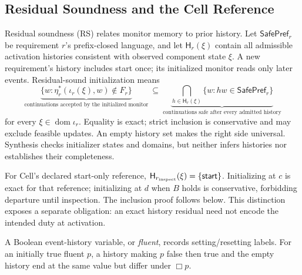\subsection{Residual Soundness and the Cell Reference}\label{ta:residual_formal}
Residual soundness (RS) relates monitor memory to prior history. Let $\mathsf{SafePref}_r$ be requirement $r$'s prefix-closed language, and let $\mathsf H_r(\xi)$ contain all admissible activation histories consistent with observed component state $\xi$. A new requirement's history includes start once; its initialized monitor reads only later events. Residual-sound initialization means
\[
 \underbrace{\{w:\eta_r^*(\iota_r(\xi),w)\notin F_r\}}_{\text{continuations accepted by the initialized monitor}}
 \ \subseteq\
 \underbrace{\bigcap_{h\in\mathsf H_r(\xi)}\{w:hw\in\mathsf{SafePref}_r\}}_{\text{continuations safe after every admitted history}}
 \tag{RS}\label{eq:residual-soundness}
\]
for every $\xi\in\operatorname{dom}\iota_r$. Equality is exact; strict inclusion is conservative and may exclude feasible updates. An empty history set makes the right side universal. Synthesis checks initializer states and domains, but neither infers histories nor establishes their completeness.

For Cell's declared start-only reference, $\mathsf H_{r_{\rm inspect}}(\xi)=\{\mathsf{start}\}$. Initializing at $c$ is exact for that reference; initializing at $d$ when $B$ holds is conservative, forbidding departure until inspection. The inclusion proof follows below. This distinction exposes a separate obligation: an exact history residual need not encode the intended duty at activation.


A Boolean event-history variable, or \emph{fluent}, records setting/resetting labels. For an initially true fluent $p$, a history making $p$ false then true and the empty history end at the same value but differ under $\Box p$. 
